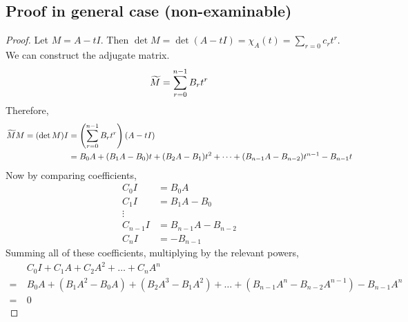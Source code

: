 \subsection{Proof in general case (non-examinable)}
\begin{proof}
	Let \(M = A - tI\).
	Then \(\det M = \det(A - tI) = \chi_A(t) = \sum_{r=0}c_r t^r\).
	We can construct the adjugate matrix.
	\[
		\widetilde{M} = \sum_{r=0}^{n-1} B_r t^r
	\]
	Therefore,
	\begin{align*}
		\widetilde{M} M = (\det M) I & = \left(\sum_{r=0}^{n-1} B_r t^r\right)(A-tI)                                             \\
		                           & = B_0A + (B_1A - B_0)t + (B_2A - B_1)t^2 + \dots + (B_{n-1}A - B_{n-2})t^{n-1} - B_{n-1}t
	\end{align*}
	Now by comparing coefficients,
	\begin{align*}
		C_0I     & = B_0A               \\
		C_1I     & = B_1A - B_0         \\
		\vdots                          \\
		C_{n-1}I & = B_{n-1}A - B_{n-2} \\
		C_n I    & = -B_{n-1}
	\end{align*}
	Summing all of these coefficients, multiplying by the relevant powers,
	\begin{align*}
		 & C_0I + C_1A + C_2A^2 + \dots + C_n A^n \\=\ &B_0A + (B_1A^2 - B_0A) + (B_2A^3 - B_1A^2) + \dots + (B_{n-1}A^n - B_{n-2}A^{n-1}) - B_{n-1}A^n \\=\ &0
	\end{align*}
\end{proof}
